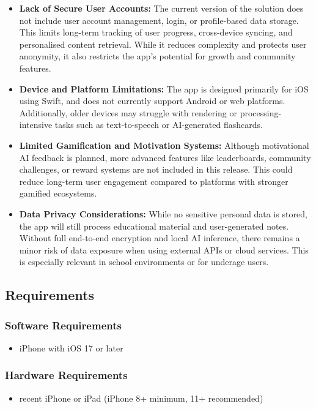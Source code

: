 \documentclass[a4paper,12pt]{article}
\begin{document}
\begin{itemize}
    \item \textbf{Lack of Secure User Accounts:} The current version of the solution does not include user account management, login, or profile-based data storage. This limits long-term tracking of user progress, cross-device syncing, and personalised content retrieval. While it reduces complexity and protects user anonymity, it also restricts the app’s potential for growth and community features.
    
    \item \textbf{Device and Platform Limitations:} The app is designed primarily for iOS using Swift, and does not currently support Android or web platforms. Additionally, older devices may struggle with rendering or processing-intensive tasks such as text-to-speech or AI-generated flashcards.
    
    \item \textbf{Limited Gamification and Motivation Systems:} Although motivational AI feedback is planned, more advanced features like leaderboards, community challenges, or reward systems are not included in this release. This could reduce long-term user engagement compared to platforms with stronger gamified ecosystems.
    
    \item \textbf{Data Privacy Considerations:} While no sensitive personal data is stored, the app will still process educational material and user-generated notes. Without full end-to-end encryption and local AI inference, there remains a minor risk of data exposure when using external APIs or cloud services. This is especially relevant in school environments or for underage users.
\end{itemize}
\subsection{Requirements}

\subsubsection*{Software Requirements}
\begin{itemize}
  \item iPhone with iOS 17 or later
\end{itemize}

\subsubsection*{Hardware Requirements}
\begin{itemize}
  \item recent iPhone or iPad (iPhone 8+ minimum, 11+ recommended)
\end{itemize}
\end{document}
